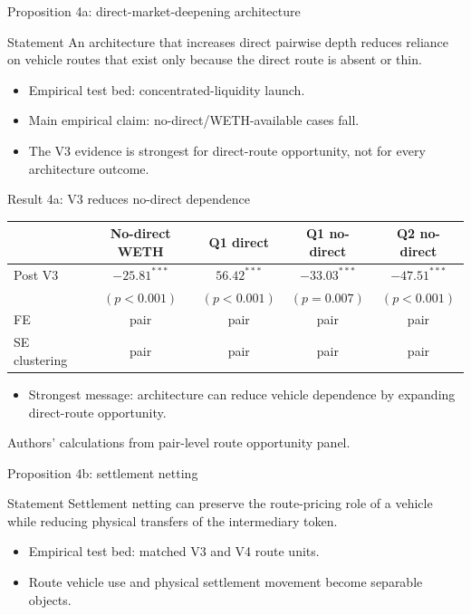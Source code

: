 \documentclass[aspectratio=169,11pt]{beamer}
\newcommand{\source}[1]{\vfill {\tiny\textcolor{DVCGrey}{#1}}}
\begin{document}
\begin{frame}{Proposition 4a: direct-market-deepening architecture}
\begin{block}{Statement}
An architecture that increases direct pairwise depth reduces reliance on vehicle routes that exist only because the direct route is absent or thin.
\end{block}
\vspace{0.6em}
\begin{itemize}
  \item Empirical test bed: concentrated-liquidity launch.
  \item Main empirical claim: no-direct/WETH-available cases fall.
  \item The V3 evidence is strongest for direct-route opportunity, not for every architecture outcome.
\end{itemize}
\end{frame}

\begin{frame}{Result 4a: V3 reduces no-direct dependence}
\scriptsize
\begin{tabular}{lcccc}
\toprule
 & No-direct WETH & Q1 direct & Q1 no-direct & Q2 no-direct \\
\midrule
Post V3 & $-25.81^{***}$ & $56.42^{***}$ & $-33.03^{***}$ & $-47.51^{***}$ \\
 & $(p<0.001)$ & $(p<0.001)$ & $(p=0.007)$ & $(p<0.001)$ \\
\midrule
FE & pair & pair & pair & pair \\
SE clustering & pair & pair & pair & pair \\
\bottomrule
\end{tabular}
\vspace{0.8em}
\begin{itemize}
  \item Strongest message: architecture can reduce vehicle dependence by expanding direct-route opportunity.
\end{itemize}
\source{Authors' calculations from pair-level route opportunity panel.}
\end{frame}

\begin{frame}{Proposition 4b: settlement netting}
\begin{block}{Statement}
Settlement netting can preserve the route-pricing role of a vehicle while reducing physical transfers of the intermediary token.
\end{block}
\vspace{0.6em}
\begin{itemize}
  \item Empirical test bed: matched V3 and V4 route units.
  \item Route vehicle use and physical settlement movement become separable objects.
\end{itemize}
\end{frame}
\end{document}
